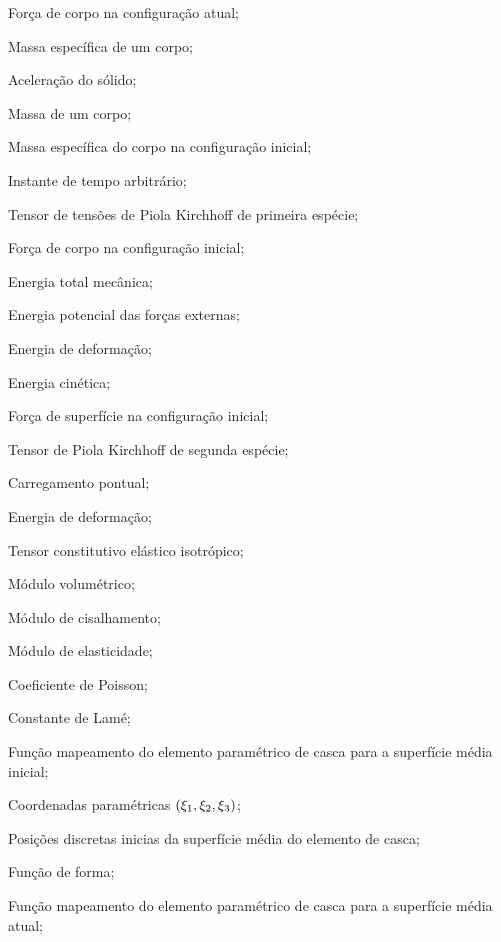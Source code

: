 \begin{simbolos}
  \item[$\ebodyLoad$] Força de corpo na configuração atual;
  \item[$\rho$] Massa específica de um corpo;
  \item[$\solidAccel$] Aceleração do sólido;
  \item[$M$] Massa de um corpo;
  \item[$\rho_{0}$] Massa específica do corpo na configuração inicial;
  \item[$\tempo$] Instante de tempo arbitrário;
  \item[$\mathbf{P}$] Tensor de tensões de Piola Kirchhoff de primeira espécie;
  \item[$\ebodyLoad_{0}$] Força de corpo na configuração inicial;
  \item[$\totalEnergy$] Energia total mecânica;
  \item[$\extEnergy$] Energia potencial das forças externas;
  \item[$\intEnergy$] Energia de deformação;
  \item[$\kinEnergy$] Energia cinética;
  \item[$\tractionLoad_{0}$] Força de superfície na configuração inicial;
  \item[$\piolaStress$] Tensor de Piola Kirchhoff de segunda espécie;
  \item[$\mathbf{F}$] Carregamento pontual;
  \item[$u_{e}$] Energia de deformação;
  \item[$\constitutiveTensor$] Tensor constitutivo elástico isotrópico;
  \item[$\bulkModulus$] Módulo volumétrico;
  \item[$\shearModulus$] Módulo de cisalhamento;
  \item[$\elasticModulus$] Módulo de elasticidade;
  \item[$\poisonsRatio$] Coeficiente de Poisson;
  \item[$\lameParameter$] Constante de Lamé;
   \item[$\fmap^{mh}_{0}$] Função mapeamento do elemento paramétrico de casca para a superfície média inicial;
   \item[$\bm{\xi}$] Coordenadas paramétricas $(\xi_1, \xi_2, \xi_3)$;
   \item[$\lPosition^{mh}$] Posições discretas inicias da superfície média do elemento de casca;
   \item[$N$] Função de forma;
   \item[$\fmap^{mh}_{1}$] Função mapeamento do elemento paramétrico de casca para a superfície média atual;

\end{simbolos}
